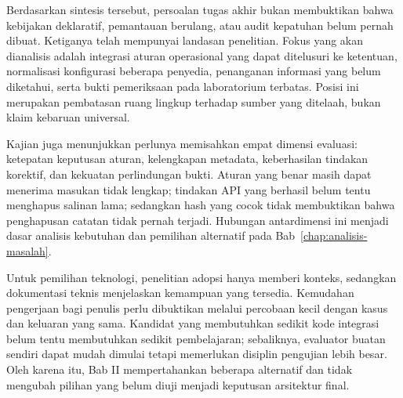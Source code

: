 Berdasarkan sintesis tersebut, persoalan tugas akhir bukan membuktikan bahwa kebijakan deklaratif, pemantauan berulang, atau audit kepatuhan belum pernah dibuat. Ketiganya telah mempunyai landasan penelitian. Fokus yang akan dianalisis adalah integrasi aturan operasional yang dapat ditelusuri ke ketentuan, normalisasi konfigurasi beberapa penyedia, penanganan informasi yang belum diketahui, serta bukti pemeriksaan pada laboratorium terbatas. Posisi ini merupakan pembatasan ruang lingkup terhadap sumber yang ditelaah, bukan klaim kebaruan universal.

Kajian juga menunjukkan perlunya memisahkan empat dimensi evaluasi: ketepatan keputusan aturan, kelengkapan metadata, keberhasilan tindakan korektif, dan kekuatan perlindungan bukti. Aturan yang benar masih dapat menerima masukan tidak lengkap; tindakan API yang berhasil belum tentu menghapus salinan lama; sedangkan hash yang cocok tidak membuktikan bahwa penghapusan catatan tidak pernah terjadi. Hubungan antardimensi ini menjadi dasar analisis kebutuhan dan pemilihan alternatif pada Bab~\ref{chap:analisis-masalah}.

Untuk pemilihan teknologi, penelitian adopsi hanya memberi konteks, sedangkan dokumentasi teknis menjelaskan kemampuan yang tersedia. Kemudahan pengerjaan bagi penulis perlu dibuktikan melalui percobaan kecil dengan kasus dan keluaran yang sama. Kandidat yang membutuhkan sedikit kode integrasi belum tentu membutuhkan sedikit pembelajaran; sebaliknya, evaluator buatan sendiri dapat mudah dimulai tetapi memerlukan disiplin pengujian lebih besar. Oleh karena itu, Bab II mempertahankan beberapa alternatif dan tidak mengubah pilihan yang belum diuji menjadi keputusan arsitektur final.
